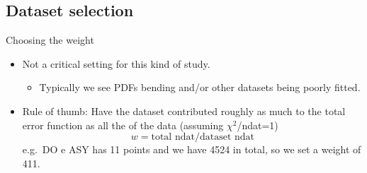 
\author[Zahari Kassabov]{}
\subsection{Dataset selection}
\begin{frame}{Choosing the weight}
\protect\hypertarget{choosing-the-weight}{}
\begin{itemize}
\tightlist
\item
  Not a critical setting for this kind of study.

  \begin{itemize}
  \tightlist
  \item
    Typically we see PDFs bending and/or other datasets being poorly
    fitted.
  \end{itemize}
\item
  Rule of thumb: Have the dataset contributed roughly as much to the
  total error function as all the of the data (assuming
  \(\chi^2\)/ndat=1) \[
  w = \text{total ndat}/\text{dataset ndat}
  \] e.g.~DO e ASY has 11 points and we have 4524 in total, so we set a
  weight of 411.

\end{itemize}
\end{frame}